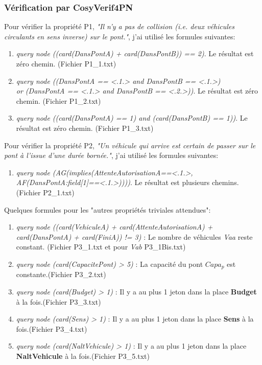 \documentclass[a4paper,11pt]{report}
\begin{document}
\subsubsection{Vérification par CosyVerif4PN}
	Pour vérifier la propriété P1, \textit{"Il n'y a pas de collision (i.e. deux véhicules circulants en sens inverse) sur le pont."}, j'ai utilisé les formules suivantes:
	\begin{enumerate}
		\item \textit{query node ((card(DansPontA) + card(DansPontB)) == 2)}. Le résultat est zéro chemin. (Fichier P1\_1.txt)
		\item \textit{query node ((DansPontA == <.1.> and DansPontB == <.1.>) 
			\\or (DansPontA == <.1.> and DansPontB == <.2.>))}. Le résultat est zéro chemin. (Fichier P1\_2.txt)
		\item \textit{query node ((card(DansPontA) == 1) and (card(DansPontB) == 1))}. Le résultat est zéro chemin. (Fichier P1\_3.txt)
	\end{enumerate}
	
		Pour vérifier la propriété P2, \textit{"Un véhicule qui arrive est certain de passer sur le pont à l'issue d'une durée bornée."}, j'ai utilisé les formules suivantes:
		\begin{enumerate}
			\item \textit{query node (AG(implies(AttenteAutorisationA==<.1.>, AF(DansPontA:field[1]==<.1.>))))}. Le résultat est plusieurs chemins. (Fichier P2\_1.txt)
	\end{enumerate}
	
	Quelques formules pour les "autres propriétés triviales attendues":
		\begin{enumerate}
				\item \textit{query node ((card(VehiculeA) + card(AttenteAutorisationA) + card(DansPontA) + card(FiniA)) != 3)} : Le nombre de véhicules \textit{Vaa} reste constant. (Fichier P3\_1.txt et pour \textit{Vab} P3\_1Bis.txt)
				\item \textit{query node (card(CapacitePont) > 5)} : La capacité du pont $Capa_p$ est constante.(Fichier P3\_2.txt)
				\item \textit{query node (card(Budget) > 1)} : Il y a au plus 1 jeton dans la place \textbf{Budget} à la fois.(Fichier P3\_3.txt)
				\item \textit{query node (card(Sens) > 1)} : Il y a au plus 1 jeton dans la place \textbf{Sens} à la fois.(Fichier P3\_4.txt)
				\item \textit{query node (card(NaltVehicule) > 1)} : Il y a au plus 1 jeton dans la place \textbf{NaltVehicule} à la fois.(Fichier P3\_5.txt)
		\end{enumerate}
\end{document}
